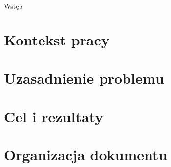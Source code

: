\begin{chapter}{Wstęp}
	\newcommand{\chapterPath}{chapters/Introduction}

	\section{Kontekst pracy}
	\section{Uzasadnienie problemu}
	\section{Cel i rezultaty}
	\section{Organizacja dokumentu}
\end{chapter}
